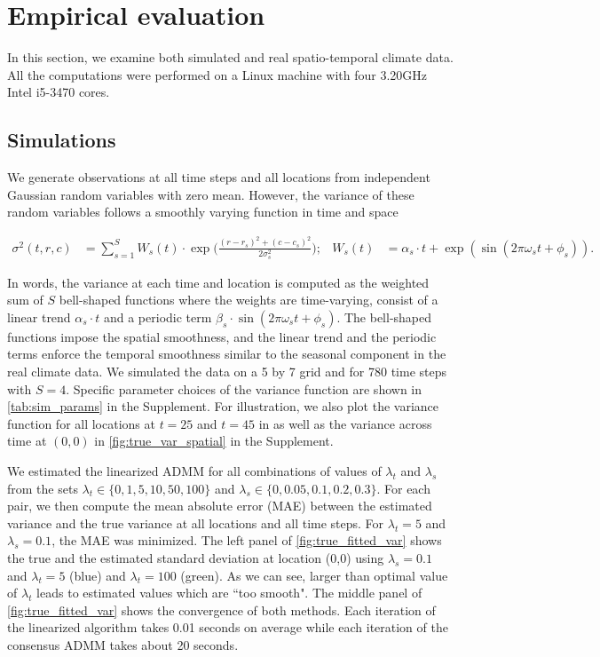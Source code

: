 \documentclass{article}
\begin{document}
\section{Empirical evaluation}
\label{sec:empirical-evaluation}

In this section, we examine both simulated and real spatio-temporal
climate data. All the computations were performed on a Linux machine
with four 3.20GHz Intel i5-3470 cores. 

\subsection{Simulations}
\label{sec:simulations}

We generate observations at all time steps and all locations from
independent Gaussian random variables with zero mean. However, the
variance of these random variables follows a smoothly varying function
in time and space

\begin{align}
\sigma^2(t,r,c) & =\sum_{s=1}^{S} W_s(t) \cdot \exp\bigg( \frac{(r-r_s)^2+(c-c_s)^2}{2\sigma_s^2} \bigg); &
W_s(t) & =\alpha_s \cdot t + \exp(\sin(2\pi\omega_s t+\phi_s)) .
\label{eq:sourceVar}
\end{align}

In words, the variance at each time and location is computed as the
weighted sum of $S$ bell-shaped functions where the weights are
time-varying, consist of a linear trend $\alpha_s \cdot t$ and a
periodic term $\beta_s \cdot \sin(2\pi\omega_s t+\phi_s)$. The
bell-shaped functions impose the spatial smoothness, and the linear
trend and the periodic terms enforce the temporal smoothness similar
to the seasonal component in the real climate data. We simulated the
data on a 5 by 7 grid and for 780 time steps with $S=4$. 
Specific parameter choices of the variance function are shown in
\autoref{tab:sim_params} in the Supplement. For illustration, we also plot the
variance function for all locations at $t=25$ and $t=45$ in as well as
the variance across time at $(0,0)$ in \autoref{fig:true_var_spatial}
in the Supplement.

We estimated the linearized ADMM for all combinations of values of
$\lambda_t$ and $\lambda_s$ from the sets $\lambda_t \in
\{0,1,5,10,50,100\}$ and $\lambda_s \in \{0,0.05,0.1,0.2,0.3\}$. For
each pair, we then compute the mean absolute error (MAE) between the
estimated variance and the true variance at all locations and all time
steps. For $\lambda_t=5$ and $\lambda_s=0.1$, the MAE was minimized. The
left panel of \autoref{fig:true_fitted_var} shows the true and the
estimated standard deviation at location (0,0) using $\lambda_s=0.1$
and $\lambda_t=5$ (blue) and $\lambda_t=100$ (green). As we can see,
larger than optimal value of $\lambda_t$ leads to estimated values
which are ``too smooth". The middle panel of \autoref{fig:true_fitted_var} shows the
convergence of both methods. Each iteration of the linearized
algorithm takes 0.01 seconds on average while each iteration of the
consensus ADMM takes about 20 seconds. 
\end{document}
